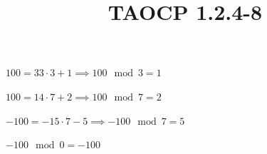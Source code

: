 \documentclass{article}
\title{TAOCP 1.2.4\mbox{-}8}
\begin{document}
\maketitle

\( 100 = 33 \cdot 3 + 1 \implies 100 \mod 3 = 1 \)

\( 100 = 14 \cdot 7 + 2 \implies 100 \mod 7 =  2 \)

\( -100 = -15 \cdot 7 - 5 \implies -100 \mod 7 = 5 \)

\( -100 \mod 0 = -100 \)
\end{document}

